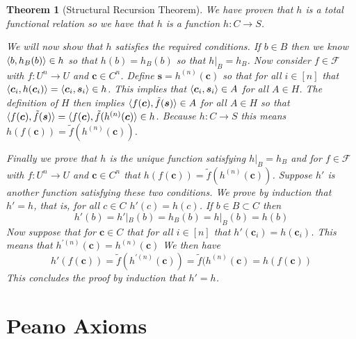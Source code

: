 \documentclass[12pt]{article}
\theoremstyle{break}
\theoremstyle{break}
\newtheorem{theorem}{Theorem}[section]
\theoremstyle{break}
\theoremstyle{break}
\theoremstyle{break}
\newtheorem{informal definition}[definition]{Informal Definition}
\newcommand{\bv}[1]{\boldsymbol{#1}}
\begin{document}
\begin{theorem}[Structural Recursion Theorem]
We have proven that $h$ is a total functional relation so we have that $h$ is a function $h:C\to S$.

We will now show that $h$ satisfies the required conditions.
If $b\in B$ then we know $\braket{b, h_B(b)} \in h$ so that $h(b) = h_B(b)$ so that $h|_B = h_B$.
Now consider $f\in \mathcal{F}$ with $f:U^n \to U$ and $\bv{c} \in C^n$.
Define $\bv{s} = h^{(n)}(\bv{c})$ so that for all $i \in [n]$ that $\braket{\bv{c}_i, h(\bv{c}_i)} = \braket{\bv{c}_i, \bv{s}_i} \in h$.
This implies that $\braket{\bv{c}_i, \bv{s}_i} \in A$ for all $A\in H$.
The definition of $H$ then implies $\braket{f(\bv{c}), \tilde{f}(\bv{s})} \in A$ for all $A\in H$ so that $\braket{f(\bv{c}), \tilde{f}(\bv{s})} = \braket{f(\bv{c}), \tilde{f}(h^{(n)}(\bv{c})} \in h$.
Because $h:C \to S$ this means $h(f(\bv{c})) = \tilde{f}(h^{(n)}(\bv{c}))$.

Finally we prove that $h$ is the unique function satisfying $h|_B = h_B$ and for $f\in \mathcal{F}$ with $f:U^n \to U$ and $\bv{c}\in C^n$ that $h(f(\bv{c})) = \tilde{f}(h^{(n)}(\bv{c}))$.
Suppose $h'$ is another function satisfying these two conditions.
We prove by induction that $h' = h$, that is, for all $c\in C$ $h'(c) = h(c)$.
If $b\in B \subset C$ then
$$
h'(b) = h'|_B(b) = h_B(b) = h|_B(b) = h(b)
$$
Now suppose that for $\bv{c} \in C$ that for all $i\in [n]$ that $h'(\bv{c}_i) = h(\bv{c}_i)$.
This means that $h^{'(n)}(\bv{c}) = h^{(n)}(\bv{c})$
We then have
$$
h'(f(\bv{c})) = \tilde{f}(h^{'(n)}(\bv{c})) = \tilde{f}(h^{(n)}(\bv{c}) = h(f(\bv{c}))
$$
This concludes the proof by induction that $h'=h$.
\end{theorem}

\section{Peano Axioms}
\end{document}
